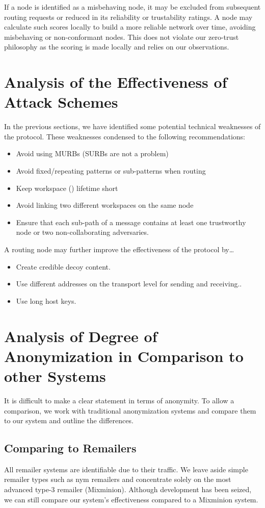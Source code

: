 If a node is identified as a misbehaving node, it may be excluded from subsequent routing requests or reduced in its reliability or trustability ratings. A node may calculate such scores locally to build a more reliable network over time, avoiding misbehaving or non-conformant nodes. This does not violate our zero-trust philosophy as the scoring is made locally and relies on our observations.


\chapter{Analysis of the Effectiveness of Attack Schemes}
In the previous sections, we have identified some potential technical weaknesses of the protocol. These weaknesses condensed to the following recommendations:
\begin{itemize}
	\item Avoid using MURBs (SURBs are not a problem)
	\item Avoid fixed/repeating patterns or sub-patterns when routing
	\item Keep workspace () lifetime short
	\item Avoid linking two different workspaces on the same node
	\item Ensure that each sub-path of a message contains at least one trustworthy node or two non-collaborating adversaries.
\end{itemize}

A routing node may further improve the effectiveness of the protocol by\ldots

\begin{itemize}
	\item Create credible decoy content.
	\item Use different addresses on the transport level for sending and receiving..
	\item Use long host keys.
\end{itemize}

\chapter[Degree of Anonymization in Comparison]{Analysis of Degree of Anonymization \MessageVortex{} in Comparison to other Systems}
It is difficult to make a clear statement in terms of anonymity. To allow a comparison, we work with traditional anonymization systems and compare them to our system and outline the differences. 

\section{Comparing \MessageVortex{} to Remailers}
All remailer systems are identifiable due to their traffic. We leave aside simple remailer types such as nym remailers and concentrate solely on the most advanced type-3 remailer (Mixminion). Although development has been seized, we can still compare our system's effectiveness compared to a Mixminion system.

